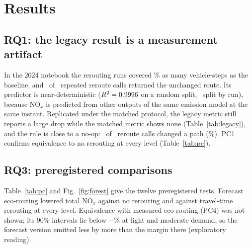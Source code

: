 \documentclass[conference]{IEEEtran}
\begin{document}
\section{Results}\label{sec:results}
\subsection{RQ1: the legacy result is a measurement artifact}
In the 2024 notebook the rerouting runs covered \LegacyRowRatioRF\% as many vehicle-steps as the baseline, and
\LegacyRepeatUnchanged\ of \LegacyRepeatCalls\ repeated reroute calls returned the unchanged route. Its predictor is
near-deterministic ($R^2 = 0.9996$ on a random split, \LegacyRFRunSplitRTwo\ split by run), because NO$_x$ is
predicted from other outputs of the same emission model at the same instant. Replicated under the matched protocol,
the legacy metric still reports a large drop while the matched metric shows none (Table~\ref{tab:legacy}), and the
rule is close to a no-op: \LegacyRecountChanges\ of \LegacyRecountCalls\ reroute calls changed a path
(\LegacyRecountRate\%). PC1 confirms equivalence to no rerouting at every level (Table~\ref{tab:pc}).

\begin{table}[t]
\centering\footnotesize
\caption{Legacy Replication on the Test Seeds (Matched Change: Negative Means Lower NO$_x$; $n$ = Seeds)}
\label{tab:legacy}

\end{table}

\subsection{RQ3: preregistered comparisons}
Table~\ref{tab:pc} and Fig.~\ref{fig:forest} give the twelve preregistered tests. Forecast eco-routing lowered total
NO$_x$ against no rerouting and against travel-time rerouting at every level. Equivalence with measured eco-routing
(PC4) was not shown; its 90\% intervals lie below $-$\SESOI\% at light and moderate demand, so the forecast version
emitted less by more than the margin there (exploratory reading).

\begin{table}[t]
\centering\footnotesize
\caption{Preregistered Comparisons: Mean Paired Change in Total NO$_x$ with BCa Intervals and Holm-Adjusted $p$
(PC1, PC4: TOST Equivalence within $\pm$\SESOI\%; PC2, PC3: Wilcoxon)}
\label{tab:pc}

\end{table}
\end{document}
